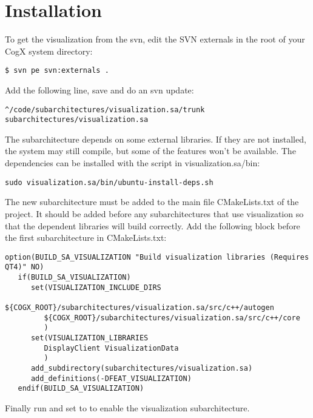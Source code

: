
\section{Installation}

To get the visualization from the svn, edit the SVN externals in the root
of your CogX system directory:

\begin{Verbatim}[fontsize=\scriptsize,gobble=3]
   $ svn pe svn:externals .
\end{Verbatim}

Add the following line, save and do an svn update:

\begin{Verbatim}[fontsize=\scriptsize,gobble=3]
   ^/code/subarchitectures/visualization.sa/trunk subarchitectures/visualization.sa
\end{Verbatim}

The subarchitecture depends on some external libraries. If they are not
installed, the system may still compile, but some of the features won't be
available. The dependencies can be installed with the script in
visualization.sa/bin: 

\begin{Verbatim}[fontsize=\scriptsize,gobble=3]
   sudo visualization.sa/bin/ubuntu-install-deps.sh
\end{Verbatim}

The new subarchitecture must be added to the main file CMakeLists.txt of the 
project. It should be added before any subarchitectures that use visualization
so that the dependent libraries will build correctly. Add the following
block before the first subarchitecture in CMakeLists.txt:

\begin{Verbatim}[fontsize=\scriptsize,gobble=3]
   option(BUILD_SA_VISUALIZATION "Build visualization libraries (Requires QT4)" NO)
   if(BUILD_SA_VISUALIZATION)
      set(VISUALIZATION_INCLUDE_DIRS
         ${COGX_ROOT}/subarchitectures/visualization.sa/src/c++/autogen
         ${COGX_ROOT}/subarchitectures/visualization.sa/src/c++/core
         )
      set(VISUALIZATION_LIBRARIES
         DisplayClient VisualizationData
         )
      add_subdirectory(subarchitectures/visualization.sa)
      add_definitions(-DFEAT_VISUALIZATION)
   endif(BUILD_SA_VISUALIZATION)
\end{Verbatim}

Finally run  and set  to 
to enable the visualization subarchitecture.


